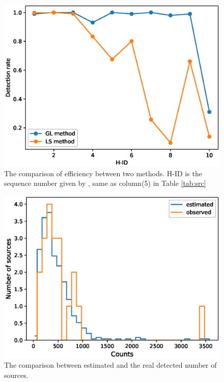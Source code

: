 \documentclass[twoside,twocolumn]{aastex63}
\begin{document}
\begin{figure}[htb]
\includegraphics[scale=0.55]{./figure/sim_LW/Pdet_com.eps}
\caption{The comparison of efficiency between two methods. H-ID is the sequence number given by \cite{2012ApJ...746..165H}, same as column(5) in Table \ref{tab:src} \label{fig:com}}
\end{figure}
\begin{figure}[htbp]
\includegraphics[scale=0.53]{./figure/sim_LW/est_obs.eps}
\caption{The comparison between estimated and the real detected number of sources. \label{fig:NP_sim}}
\end{figure}
\end{document}
